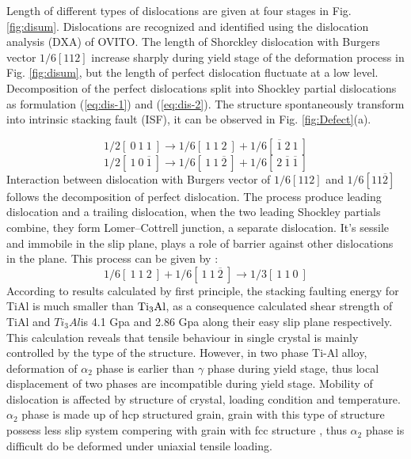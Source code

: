 \documentclass[Unknown,article,submit,moreauthors,pdftex,10pt,a4paper]{Definitions/mdpi}
\begin{document}
Length of different types of dislocations are given at four stages in Fig. \ref{fig:disum}. Dislocations are recognized and identified using the dislocation analysis (DXA) of OVITO. The length of Shorckley dislocation with Burgers vector $1/6[1 1 2]$ increase sharply during yield stage of the deformation process in Fig. \ref{fig:disum}, but the length of perfect dislocation fluctuate at a low level. Decomposition of the perfect  dislocations split into Shockley partial dislocations as formulation (\ref{eq:dis-1}) and (\ref{eq:dis-2}). The structure spontaneously transform into intrinsic stacking fault (ISF), it can be observed in Fig. \ref{fig:Defect}(a). 


\begin{equation}\label{eq:dis-1}
1/2 [\ 0\ 1\ 1\ ] \to 1/6[\ 1\ 1\ 2\ ]+1/6[\ \overline{1}\ 2\ 1\ ]
\end{equation}
\begin{equation}\label{eq:dis-2}
1/2 [\ 1\ 0\ \overline{1}\ ] \to 1/6 [\ 1\ 1\ \overline{2}\ ] + 1/6[\ 2\ \overline{1}\ \overline{1}\ ]
\end{equation}
Interaction between dislocation with Burgers vector of $1/6 [112] $ and $ 1/6 [11\overline{2}]$ follows the decomposition of perfect dislocation. The process produce leading dislocation and a trailing dislocation, when the two leading Shockley partials combine, they form Lomer–Cottrell junction, a separate dislocation. It's sessile and immobile in the slip plane, plays a role of barrier against other dislocations in the plane. This process can be given by :
\begin{equation}\label{eq:dis-3}
1/6 [\ 1\ 1\ 2\ ] + 1/6 [\ 1\ 1\  \overline{2}\ ] \to 1/3 [\ 1\ 1\ 0\ ]
\end{equation}
According to results calculated by first principle, the stacking faulting energy for TiAl is much smaller than $\rm{Ti_3Al}$, as a consequence calculated shear strength of TiAl and $Ti_3Al$is 4.1 Gpa and 2.86 Gpa along their easy slip plane respectively\cite{Liu2007}. This calculation reveals that tensile behaviour in single crystal is mainly controlled by the type of the structure. However, in two phase Ti-Al alloy, deformation of $\alpha_2$ phase is earlier than $\gamma$ phase during yield stage, thus local displacement of two phases are incompatible during yield stage.  Mobility of dislocation is affected by structure of crystal, loading condition and temperature. $\alpha_2$ phase is made up of hcp  structured grain, grain with this type of structure possess less slip system compering with grain with fcc structure \cite{Zhu2012}, thus $\alpha_2$ phase is difficult do be deformed under uniaxial tensile loading. 
\end{document}
